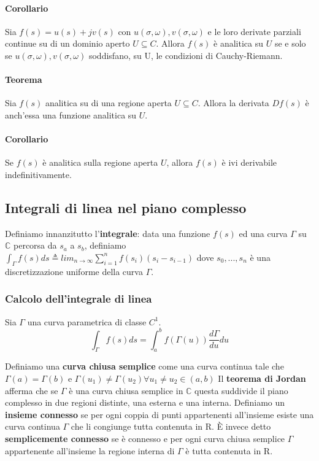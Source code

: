 \documentclass[11pt]{article}
\begin{document}
\paragraph{Corollario}
Sia $f(s) = u(s) + jv(s)$ con $u(\sigma, \omega), v(\sigma, \omega)$ e le loro derivate parziali continue su di un dominio aperto $U \subseteq C$. Allora $f(s)$ è analitica su $U$ se e solo se $u(\sigma, \omega), v(\sigma, \omega)$ soddisfano, su U, le condizioni di Cauchy-Riemann.
\paragraph{Teorema}
Sia $f(s)$ analitica su di una regione aperta $U \subseteq C$. Allora la derivata $Df(s)$ è anch'essa una funzione analitica su $U$.
\paragraph{Corollario}
Se $f(s)$ è analitica sulla regione aperta $U$, allora $f(s)$ è ivi derivabile indefinitivamente.
\subsection{Integrali di linea nel piano complesso}
Definiamo innanzitutto l'\textbf{integrale}: data una funzione $f(s)$ ed una curva $\Gamma$ su $\mathbb{C}$ percorsa da $s_a$ a $s_b$, definiamo $\int_\Gamma f(s) ds \triangleq lim_{n\rightarrow \infty} \sum_{i=1}^n f(s_i)(s_i- s_{i-1})$ dove $s_0,...,s_n$ è una discretizzazione uniforme della curva $\Gamma$.
\subsubsection{Calcolo dell'integrale di linea}
Sia $\Gamma$ una curva parametrica di classe $C^1$.
\begin{displaymath}
    \int_\Gamma f(s) ds = \int_a^b f\left(\Gamma(u) \right) \frac{d\Gamma}{du} du
\end{displaymath}

Definiamo una \textbf{curva chiusa semplice} come una curva continua tale che $\Gamma(a)=\Gamma(b)$ e $\Gamma(u_1) \neq \Gamma(u_2) \forall u_1 \neq u_2 \in (a,b)$
Il \textbf{teorema di Jordan} afferma che se $\Gamma$ è una curva chiusa semplice in $\mathbb{C}$ questa suddivide il piano complesso in due regioni distinte, una esterna e una interna.
Definiamo un \textbf{insieme connesso} se per ogni coppia di punti appartenenti all'insieme esiste una curva continua $\Gamma$ che li congiunge tutta contenuta in R. È invece detto \textbf{semplicemente connesso} se è connesso e per ogni curva chiusa semplice $\Gamma$ appartenente all'insieme la regione interna di $\Gamma$ è tutta contenuta in R.
\end{document}

